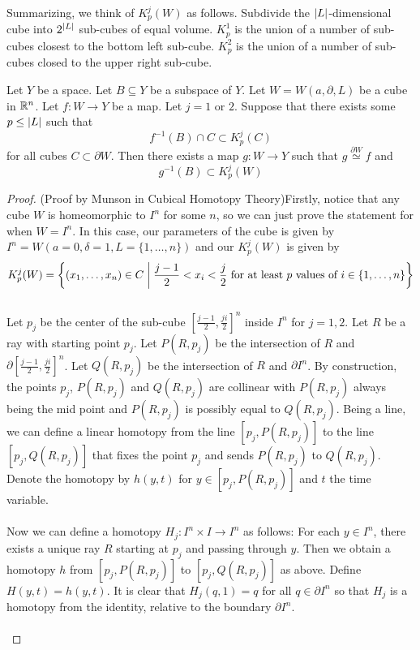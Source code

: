\documentclass[a4paper]{article}
\begin{document}
Summarizing, we think of $K_p^j(W)$ as follows. Subdivide the $\abs{L}$-dimensional cube into $2^\abs{L}$ sub-cubes of equal volume. $K_p^1$ is the union of a number of sub-cubes closest to the bottom left sub-cube. $K_p^2$ is the union of a number of sub-cubes closed to the upper right sub-cube. 

\begin{lmm}{}{} Let $Y$ be a space. Let $B\subseteq Y$ be a subspace of $Y$. Let $W=W(a,\partial, L)$ be a cube in $\mathbb{R}^n$. Let $f:W\to Y$ be a map. Let $j=1$ or $2$. Suppose that there exists some $p\leq\abs{L}$ such that $$f^{-1}(B)\cap C\subset K_p^j(C)$$ for all cubes $C\subset\partial W$. Then there exists a map $g:W\to Y$ such that $g\overset{\partial W}{\simeq} f$ and $$g^{-1}(B)\subset K_p^j(W)$$ \tcbline
\begin{proof}
(Proof by Munson in Cubical Homotopy Theory)Firstly, notice that any cube $W$ is homeomorphic to $I^n$ for some $n$, so we can just prove the statement for when $W=I^n$. In this case, our parameters of the cube is given by $I^n=W(a=0,\delta=1,L=\{1,\dots,n\})$ and our $K_p^j(W)$ is given by $$K_p^j(W)=\left\{(x_1,\dots,x_n)\in C\;\bigg{|}\;\frac{j-1}{2}<x_i<\frac{j}{2}\text{ for at least }p\text{ values of }i\in\{1,\dots,n\}\right\}$$~\\

Let $p_j$ be the center of the sub-cube $\left[\frac{j-1}{2},\frac{ji}{2}\right]^n$ inside $I^n$ for $j=1,2$. Let $R$ be a ray with starting point $p_j$. Let $P(R,p_j)$ be the intersection of $R$ and $\partial\left[\frac{j-1}{2},\frac{ji}{2}\right]^n$. Let $Q(R,p_j)$ be the intersection of $R$ and $\partial I^n$. By construction, the points $p_j$, $P(R,p_j)$ and $Q(R,p_j)$ are collinear with $P(R,p_j)$ always being the mid point and $P(R,p_j)$ is possibly equal to $Q(R,p_j)$. Being a line, we can define a linear homotopy from the line $[p_j,P(R,p_j)]$ to the line $[p_j,Q(R,p_j)]$ that fixes the point $p_j$ and sends $P(R,p_j)$ to $Q(R,p_j)$. Denote the homotopy by $h(y,t)$ for $y\in[p_j,P(R,p_j)]$ and $t$ the time variable. \\~\\

Now we can define a homotopy $H_j:I^n\times I\to I^n$ as follows: For each $y\in I^n$, there exists a unique ray $R$ starting at $p_j$ and passing through $y$. Then we obtain a homotopy $h$ from $[p_j,P(R,p_j)]$ to $[p_j,Q(R,p_j)]$ as above. Define $H(y,t)=h(y,t)$. It is clear that $H_j(q,1)=q$ for all $q\in\partial I^n$ so that $H_j$ is a homotopy from the identity, relative to the boundary $\partial I^n$. \\~\\


\end{proof}
\end{lmm}
\end{document}
